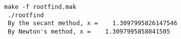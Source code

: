 \begin{Verbatim}[frame=lines,label=rootfind - commands and output]
 make -f rootfind.mak
 ./rootfind
 By the secant method, x =    1.3097995826147546     
 By Newton's method, x =    1.3097995858041505     
\end{Verbatim}
